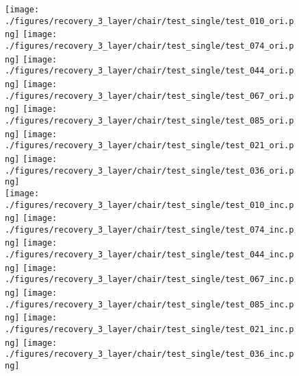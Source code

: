 \documentclass[10pt,twocolumn,letterpaper]{article}
\begin{document}
 \begin{figure}
	\centering
	\texttt{[image: ./figures/recovery\_3\_layer/chair/test\_single/test\_010\_ori.png]} \hspace{-1.8mm}
	\texttt{[image: ./figures/recovery\_3\_layer/chair/test\_single/test\_074\_ori.png]} \hspace{-1.8mm}
    \texttt{[image: ./figures/recovery\_3\_layer/chair/test\_single/test\_044\_ori.png]} \hspace{-1.8mm}
    \texttt{[image: ./figures/recovery\_3\_layer/chair/test\_single/test\_067\_ori.png]} \hspace{-1.8mm}
    \texttt{[image: ./figures/recovery\_3\_layer/chair/test\_single/test\_085\_ori.png]} \hspace{-1.8mm}
    \texttt{[image: ./figures/recovery\_3\_layer/chair/test\_single/test\_021\_ori.png]} \hspace{-1.8mm}    
    \texttt{[image: ./figures/recovery\_3\_layer/chair/test\_single/test\_036\_ori.png]}   
     \\
	\texttt{[image: ./figures/recovery\_3\_layer/chair/test\_single/test\_010\_inc.png]} \hspace{-1.8mm}
	\texttt{[image: ./figures/recovery\_3\_layer/chair/test\_single/test\_074\_inc.png]} \hspace{-1.8mm}
    \texttt{[image: ./figures/recovery\_3\_layer/chair/test\_single/test\_044\_inc.png]} \hspace{-1.8mm}
    \texttt{[image: ./figures/recovery\_3\_layer/chair/test\_single/test\_067\_inc.png]} \hspace{-1.8mm}
    \texttt{[image: ./figures/recovery\_3\_layer/chair/test\_single/test\_085\_inc.png]} \hspace{-1.8mm}
    \texttt{[image: ./figures/recovery\_3\_layer/chair/test\_single/test\_021\_inc.png]} \hspace{-1.8mm}   
    \texttt{[image: ./figures/recovery\_3\_layer/chair/test\_single/test\_036\_inc.png]} 
     \\

\end{figure}
\end{document}
